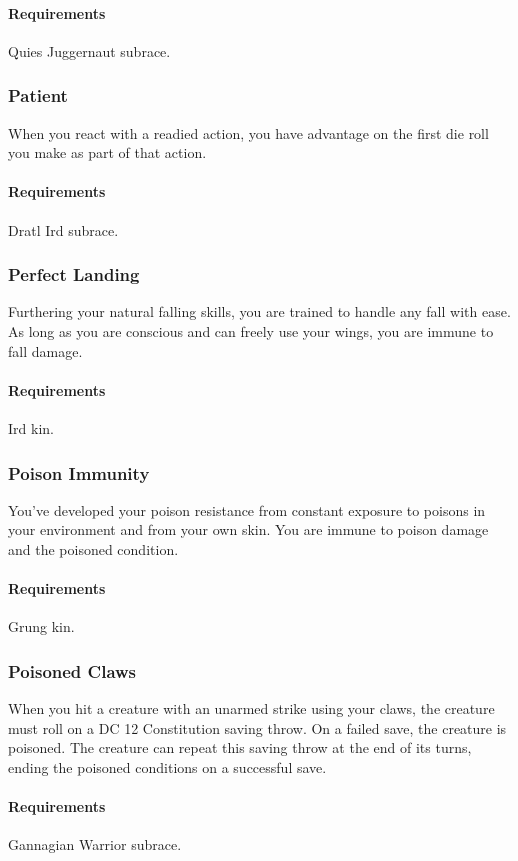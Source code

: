     \paragraph{Requirements} Quies Juggernaut subrace.
\subsubsection{Patient} \label{feat::patient}
    When you react with a readied action, you have advantage on the first die roll you make as part of that action.
    \paragraph{Requirements} Dratl Ird subrace.
\subsubsection{Perfect Landing} \label{feat::perfectlanding}
    Furthering your natural falling skills, you are trained to handle any fall with ease.
    As long as you are conscious and can freely use your wings, you are immune to fall damage.
    \paragraph{Requirements} Ird kin.
\subsubsection{Poison Immunity} \label{feat::poisonimmunity}
    You've developed your poison resistance from constant exposure to poisons in your environment and from your own skin.
    You are immune to poison damage and the poisoned condition.
    \paragraph{Requirements} Grung kin.
\subsubsection{Poisoned Claws} \label{feat::poisonedclaws}
    When you hit a creature with an unarmed strike using your claws, the creature must roll on a DC 12 Constitution saving throw.
    On a failed save, the creature is poisoned.
    The creature can repeat this saving throw at the end of its turns, ending the poisoned conditions on a successful save.
    \paragraph{Requirements} Gannagian Warrior subrace.
